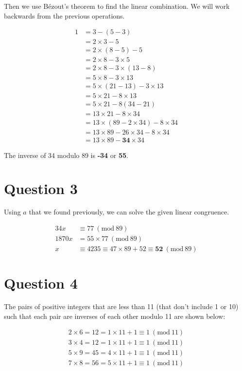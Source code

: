 \documentclass[11pt]{article}
\newcommand{\PMod}[1]{\ (\mathrm{mod}\ #1)}
\begin{document}
Then we use B\'{e}zout's theorem to find the linear combination. We will work backwards from the previous operations.

\begin{align*}
    1 &= 3 - (5 - 3)\\
    &= 2 \times 3 - 5\\
    &= 2 \times (8 - 5) - 5\\
    &= 2 \times 8 - 3 \times 5\\
    &= 2 \times 8 - 3 \times (13 - 8)\\
    &= 5 \times 8 - 3 \times 13\\
    &= 5 \times (21 - 13) - 3 \times 13\\
    &= 5 \times 21 - 8 \times 13\\
    &= 5 \times 21 - 8 (34 - 21)\\
    &= 13 \times 21 - 8 \times 34\\
    &= 13 \times (89 - 2 \times 34) - 8 \times 34\\
    &= 13 \times 89 - 26 \times 34 - 8 \times 34\\
    &= 13 \times 89 - \boxed{\mathbf{34}} \times 34
\end{align*}

The inverse of 34 modulo 89 is \textbf{-34} or \textbf{55}.

\section*{Question 3}
Using $a$ that we found previously, we can solve the given linear congruence.

\begin{align*}
    34x &\equiv 77 \PMod{89}\\
    1870x &= 55 \times 77 \PMod{89}\\
    x &\equiv 4235 \equiv 47 \times 89 + 52 \equiv \boxed{\mathbf{52}}\PMod{89}
\end{align*}

\section*{Question 4}
The pairs of positive integers that are less than 11 (that don't include 1 or 10) such that each pair are inverses of each other modulo 11 are shown below:

\begin{align*}
    2 \times 6 = 12 = 1\times 11 + 1 \equiv 1 \PMod{11} \\
    3 \times 4 = 12 = 1 \times 11 + 1 \equiv 1 \PMod{11}\\
    5 \times 9 = 45 = 4 \times 11 + 1 \equiv 1 \PMod{11}\\
    7 \times 8 = 56 = 5 \times 11 + 1 \equiv 1 \PMod{11}\\
\end{align*}
\end{document}
